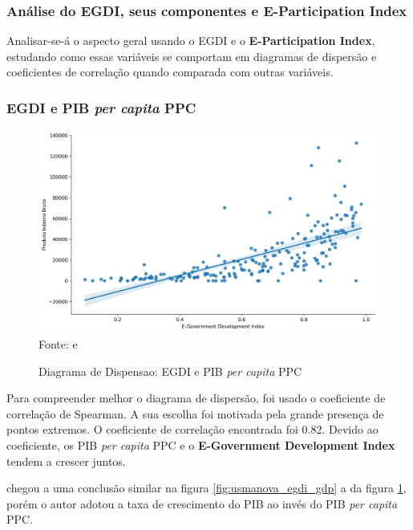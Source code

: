\subsubsection{Análise do EGDI, seus componentes e E-Participation Index}

Analisar-se-á o aspecto geral usando o EGDI e o \textbf{E-Participation Index}, estudando como essas variáveis se comportam em diagramas de dispersão e coeficientes de correlação quando comparada com outras variáveis.

\subsubsection{EGDI e PIB \textit{per capita} PPC}

\begin{figure}[H]
	\centering
	\caption{Diagrama de Dispensao: EGDI e PIB \textit{per capita} PPC}
	\includegraphics[width=1\linewidth]{figuras/egdi/dispensao_egov_pib}
	\label{fig:dispensao_egov_pib}
	\footnotesize{Fonte: \cite{ONU_EGDI} e \cite{WB_pib_per_capita_países}}
\end{figure}

Para compreender melhor o diagrama de dispersão, foi usado o coeficiente de correlação de Spearman. A sua escolha foi motivada pela grande presença de pontos extremos. O coeficiente de correlação encontrada foi 0.82. Devido ao coeficiente, os PIB \textit{per capita} PPC e o \textbf{E-Government Development Index} tendem a crescer juntos.

\cite{alisherovna2021whether} chegou a uma conclusão similar na figura \ref{fig:usmanova_egdi_gdp} a da figura \ref{fig:dispensao_egov_pib}, porém o autor adotou a taxa de crescimento do PIB ao invés do PIB \textit{per capita} PPC.

